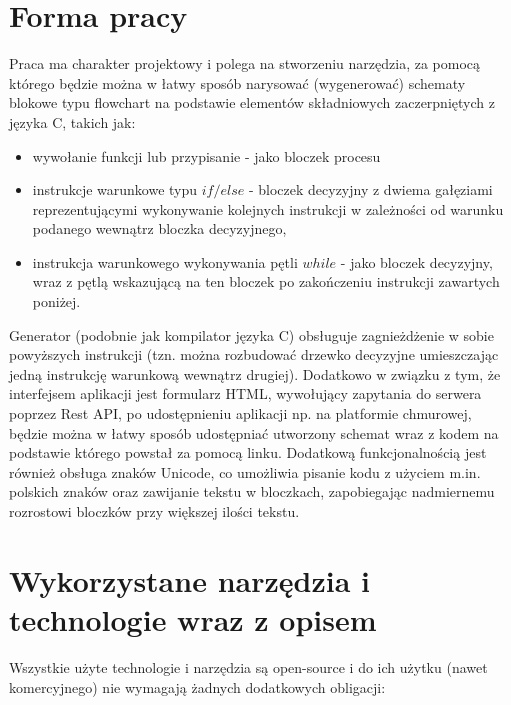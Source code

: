 \section{Forma pracy}
	Praca ma charakter projektowy i polega na stworzeniu narzędzia, za pomocą którego będzie można w łatwy sposób narysować (wygenerować) schematy blokowe typu flowchart na podstawie elementów składniowych zaczerpniętych z języka C, takich jak:

\begin{itemize}
	\item {
		wywołanie funkcji lub przypisanie - jako bloczek procesu
	}
	\item instrukcje warunkowe typu $if / else$ - bloczek decyzyjny z dwiema gałęziami reprezentującymi wykonywanie kolejnych instrukcji w zależności od warunku podanego wewnątrz bloczka decyzyjnego,
	\item  instrukcja warunkowego wykonywania pętli $while$ - jako bloczek decyzyjny, wraz z pętlą wskazującą na ten bloczek po zakończeniu instrukcji zawartych poniżej.
\end{itemize}

  Generator (podobnie jak kompilator języka C) obsługuje zagnieżdżenie w sobie powyższych instrukcji (tzn. można rozbudować drzewko decyzyjne umieszczając jedną instrukcję warunkową wewnątrz drugiej). Dodatkowo w związku z tym, że interfejsem aplikacji jest formularz HTML, wywołujący zapytania do serwera poprzez Rest API, po udostępnieniu aplikacji np. na platformie chmurowej, będzie można w łatwy sposób udostępniać utworzony schemat wraz z kodem na podstawie którego powstał za pomocą linku. Dodatkową funkcjonalnością jest również obsługa znaków Unicode, co umożliwia pisanie kodu z użyciem m.in. polskich znaków oraz zawijanie tekstu w bloczkach, zapobiegając nadmiernemu rozrostowi bloczków przy większej ilości tekstu.
  
\section{Wykorzystane narzędzia i technologie wraz z opisem}
	Wszystkie użyte technologie i narzędzia są open-source i do ich użytku (nawet komercyjnego) nie wymagają żadnych dodatkowych obligacji:

